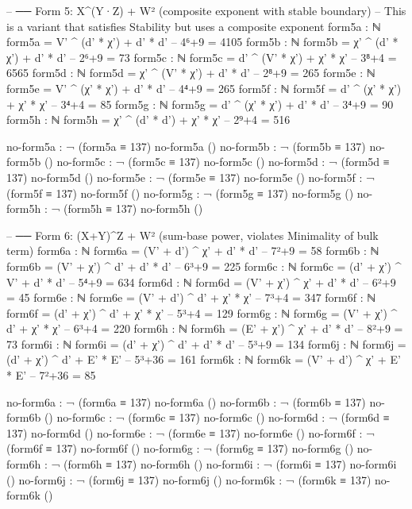 \documentclass[11pt,a4paper]{article}
\begin{document}
\begin{code}
-- ── Form 5: X^(Y·Z) + W²  (composite exponent with stable boundary)
-- This is a variant that satisfies Stability but uses a composite exponent
form5a : ℕ
form5a = V' ^ (d' * χ') + d' * d'          -- 4⁶+9 = 4105
form5b : ℕ
form5b = χ' ^ (d' * χ') + d' * d'          -- 2⁶+9 = 73
form5c : ℕ
form5c = d' ^ (V' * χ') + χ' * χ'          -- 3⁸+4 = 6565
form5d : ℕ
form5d = χ' ^ (V' * χ') + d' * d'          -- 2⁸+9 = 265
form5e : ℕ
form5e = V' ^ (χ' * χ') + d' * d'          -- 4⁴+9 = 265
form5f : ℕ
form5f = d' ^ (χ' * χ') + χ' * χ'          -- 3⁴+4 = 85
form5g : ℕ
form5g = d' ^ (χ' * χ') + d' * d'          -- 3⁴+9 = 90
form5h : ℕ
form5h = χ' ^ (d' * d') + χ' * χ'          -- 2⁹+4 = 516

no-form5a : ¬ (form5a ≡ 137)
no-form5a ()
no-form5b : ¬ (form5b ≡ 137)
no-form5b ()
no-form5c : ¬ (form5c ≡ 137)
no-form5c ()
no-form5d : ¬ (form5d ≡ 137)
no-form5d ()
no-form5e : ¬ (form5e ≡ 137)
no-form5e ()
no-form5f : ¬ (form5f ≡ 137)
no-form5f ()
no-form5g : ¬ (form5g ≡ 137)
no-form5g ()
no-form5h : ¬ (form5h ≡ 137)
no-form5h ()
\end{code}

\begin{code}
-- ── Form 6: (X+Y)^Z + W²  (sum-base power, violates Minimality of bulk term)
form6a : ℕ
form6a = (V' + d') ^ χ' + d' * d'          -- 7²+9 = 58
form6b : ℕ
form6b = (V' + χ') ^ d' + d' * d'          -- 6³+9 = 225
form6c : ℕ
form6c = (d' + χ') ^ V' + d' * d'          -- 5⁴+9 = 634
form6d : ℕ
form6d = (V' + χ') ^ χ' + d' * d'          -- 6²+9 = 45
form6e : ℕ
form6e = (V' + d') ^ d' + χ' * χ'          -- 7³+4 = 347
form6f : ℕ
form6f = (d' + χ') ^ d' + χ' * χ'          -- 5³+4 = 129
form6g : ℕ
form6g = (V' + χ') ^ d' + χ' * χ'          -- 6³+4 = 220
form6h : ℕ
form6h = (E' + χ') ^ χ' + d' * d'          -- 8²+9 = 73
form6i : ℕ
form6i = (d' + χ') ^ d' + d' * d'          -- 5³+9 = 134
form6j : ℕ
form6j = (d' + χ') ^ d' + E' * E'          -- 5³+36 = 161
form6k : ℕ
form6k = (V' + d') ^ χ' + E' * E'          -- 7²+36 = 85

no-form6a : ¬ (form6a ≡ 137)
no-form6a ()
no-form6b : ¬ (form6b ≡ 137)
no-form6b ()
no-form6c : ¬ (form6c ≡ 137)
no-form6c ()
no-form6d : ¬ (form6d ≡ 137)
no-form6d ()
no-form6e : ¬ (form6e ≡ 137)
no-form6e ()
no-form6f : ¬ (form6f ≡ 137)
no-form6f ()
no-form6g : ¬ (form6g ≡ 137)
no-form6g ()
no-form6h : ¬ (form6h ≡ 137)
no-form6h ()
no-form6i : ¬ (form6i ≡ 137)
no-form6i ()
no-form6j : ¬ (form6j ≡ 137)
no-form6j ()
no-form6k : ¬ (form6k ≡ 137)
no-form6k ()
\end{code}
\end{document}
